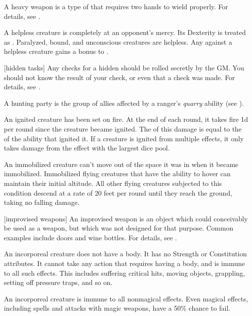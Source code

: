  A heavy weapon is a type of  that requires two hands to wield properly.
For details, see .

 A helpless creature is completely at an opponent's mercy.
Its Dexterity is treated as .
Paralyzed, bound, and unconscious creatures are helpless.
Any  against a helpless creature gains a  bonus to .

[hidden tasks] Any checks for a hidden  should be rolled secretly by the GM.\@
You should not know the result of your check, or even that a check was made.
For details, see .

 A hunting party is the group of allies affected by a ranger's \textit{quarry} ability (see ).

 An ignited creature has been set on fire.
At the end of each round, it takes fire  \minus1d per round since the creature became ignited.
The  of this damage is equal to the  of the ability that ignited it.
If a creature is ignited from multiple effects, it only takes damage from the effect with the largest dice pool.

 An immobilized creature can't move out of the space it was in when it became immobilized.
Immobilized flying creatures that have the ability to hover can maintain their initial altitude.
All other flying creatures subjected to this condition descend at a rate of 20 feet per round until they reach the ground, taking no falling damage.

[improvised weapons] An improvised weapon is an object which could conceivably be used as a weapon, but which was not designed for that purpose.
Common examples include doors and wine bottles.
For details, see .

 An incorporeal creature does not have a body.
It has no Strength or Constitution attributes.
It cannot take any action that requires having a body, and is immune to all such effects.
This includes suffering critical hits, moving objects, grappling, setting off pressure traps, and so on.

An incorporeal creature is immune to all nonmagical effects.
Even magical effects, including spells and attacks with magic weapons, have a 50\% chance to fail.

